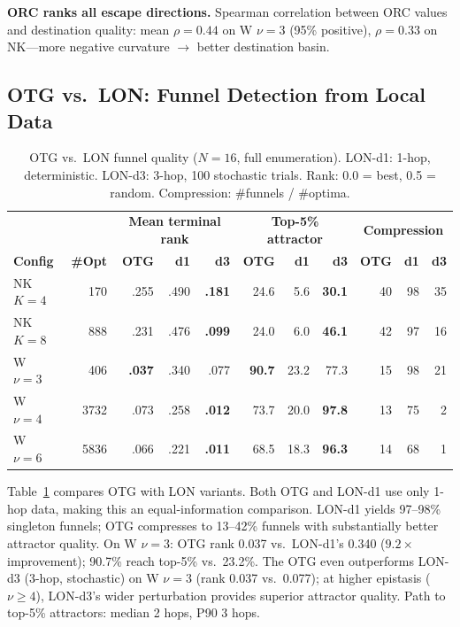 \documentclass[runningheads]{llncs}
\begin{document}
\textbf{ORC ranks all escape directions.}
Spearman correlation between ORC values and destination quality: mean $\rho\!=\!0.44$ on W $\nu\!=\!3$ (95\% positive), $\rho\!=\!0.33$ on NK---more negative curvature $\to$ better destination basin.

\subsection{OTG vs.\ LON: Funnel Detection from Local Data}
\label{sec:otg_vs_lon}

\begin{table}[t]
\caption{OTG vs.\ LON funnel quality ($N\!=\!16$, full enumeration). LON-d1: 1-hop, deterministic. LON-d3: 3-hop, 100 stochastic trials. Rank: 0.0 = best, 0.5 = random. Compression: \#funnels / \#optima.}
\label{tab:otg_vs_lon}
\centering
\small
\begin{tabular}{@{}lr|rrr|rrr|rrr@{}}
\toprule
& & \multicolumn{3}{c|}{\textbf{Mean terminal rank}} & \multicolumn{3}{c|}{\textbf{Top-5\% attractor}} & \multicolumn{3}{c}{\textbf{Compression}} \\
\textbf{Config} & \textbf{\#Opt} & \textbf{OTG} & \textbf{d1} & \textbf{d3} & \textbf{OTG} & \textbf{d1} & \textbf{d3} & \textbf{OTG} & \textbf{d1} & \textbf{d3} \\
\midrule
NK $K\!=\!4$ & 170  & .255 & .490 & \textbf{.181} & 24.6 & 5.6 & \textbf{30.1} & 40 & 98 & 35 \\
NK $K\!=\!8$ & 888  & .231 & .476 & \textbf{.099} & 24.0 & 6.0 & \textbf{46.1} & 42 & 97 & 16 \\
\midrule
W $\nu\!=\!3$  & 406  & \textbf{.037} & .340 & .077 & \textbf{90.7} & 23.2 & 77.3 & 15 & 98 & 21 \\
W $\nu\!=\!4$  & 3732 & .073 & .258 & \textbf{.012} & 73.7 & 20.0 & \textbf{97.8} & 13 & 75 & 2 \\
W $\nu\!=\!6$  & 5836 & .066 & .221 & \textbf{.011} & 68.5 & 18.3 & \textbf{96.3} & 14 & 68 & 1 \\
\bottomrule
\end{tabular}
\end{table}

Table~\ref{tab:otg_vs_lon} compares OTG with LON variants.
Both OTG and LON-d1 use only 1-hop data, making this an equal-information comparison.
LON-d1 yields 97--98\% singleton funnels; OTG compresses to 13--42\% funnels with substantially better attractor quality.
On W $\nu\!=\!3$: OTG rank 0.037 vs.\ LON-d1's 0.340 ($9.2\times$ improvement); 90.7\% reach top-5\% vs.\ 23.2\%.
The OTG even outperforms LON-d3 (3-hop, stochastic) on W $\nu\!=\!3$ (rank 0.037 vs.\ 0.077); at higher epistasis ($\nu \ge 4$), LON-d3's wider perturbation provides superior attractor quality.
Path to top-5\% attractors: median 2 hops, P90 3 hops.
\end{document}
